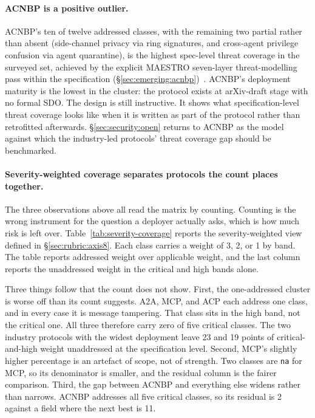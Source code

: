 \paragraph{ACNBP is a positive outlier.}
ACNBP's ten of twelve addressed classes, with the remaining
two partial rather than absent (side-channel privacy via
ring signatures, and cross-agent privilege confusion via
agent quarantine), is the highest spec-level threat
coverage in the surveyed set, achieved by the explicit
MAESTRO seven-layer threat-modelling pass within the
specification (\S\ref{sec:emerging:acnbp})~\cite{spec_acnbp}.
ACNBP's deployment maturity is the lowest in the cluster:
the protocol exists at arXiv-draft stage with no
formal SDO. The design is still instructive. It shows what
specification-level threat coverage looks like when it is
written as part of the protocol rather than retrofitted
afterwards. \S\ref{sec:security:open} returns to ACNBP as
the model against which the industry-led protocols' threat
coverage gap should be benchmarked.

\paragraph{Severity-weighted coverage separates protocols
the count places together.}
The three observations above all read the matrix by
counting. Counting is the wrong instrument for the question
a deployer actually asks, which is how much risk is left
over. Table~\ref{tab:severity-coverage} reports the
severity-weighted view defined in \S\ref{sec:rubric:axis8}.
Each class carries a weight of 3, 2, or 1 by band. The
table reports addressed weight over applicable weight, and
the last column reports the unaddressed weight in the
critical and high bands alone.



Three things follow that the count does not show. First,
the one-addressed cluster is worse off than its count
suggests. A2A, MCP, and ACP each address one class, and in
every case it is message tampering. That class sits in the
high band, not the critical one. All three therefore
carry zero of five critical classes. The two industry
protocols with the widest deployment leave 23 and 19 points
of critical-and-high weight unaddressed at the
specification level. Second, MCP's slightly higher
percentage is an artefact of scope, not of strength. Two
classes are \texttt{na} for MCP, so its denominator is
smaller, and the residual column is the fairer comparison.
Third, the gap between ACNBP and everything else widens
rather than narrows. ACNBP addresses all five critical
classes, so its residual is 2 against a field where the
next best is 11.

